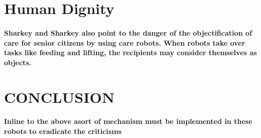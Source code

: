 \documentclass[09pt,a4paper]{article}
\begin{document}
\section{Human Dignity}
\paragraph{Sharkey and Sharkey \cite{sharkey2012granny} also point to the danger of the objectification of care for senior citizens by using care robots. When robots take over tasks like feeding and lifting, the recipients may consider themselves as objects.}
\section{CONCLUSION}
\paragraph{Inline to the above asort of mechanism must be implemented in these robots to eradicate the criticisms}


\end{document}

